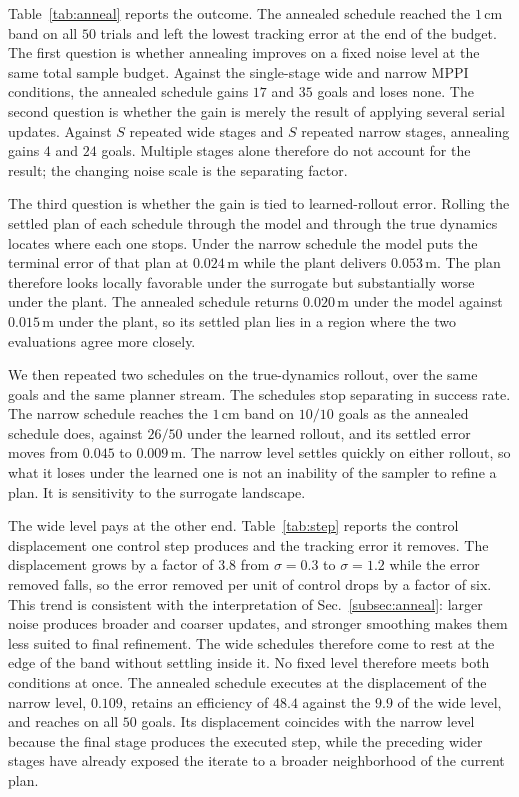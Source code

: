 \documentclass[letterpaper,10pt,conference]{ieeeconf}
\begin{document}
Table~\ref{tab:anneal} reports the outcome.
The annealed schedule reached the $1$\,cm band on all $50$ trials and left the lowest tracking error at the end of the budget.
The first question is whether annealing improves on a fixed noise level at the same total sample budget.
Against the single-stage wide and narrow MPPI conditions, the annealed schedule gains $17$ and $35$ goals and loses none.
The second question is whether the gain is merely the result of applying several serial updates.
Against $S$ repeated wide stages and $S$ repeated narrow stages, annealing gains $4$ and $24$ goals.
Multiple stages alone therefore do not account for the result; the changing noise scale is the separating factor.

The third question is whether the gain is tied to learned-rollout error.
Rolling the settled plan of each schedule through the model and through the true dynamics locates where each one stops.
Under the narrow schedule the model puts the terminal error of that plan at $0.024$\,m while the plant delivers $0.053$\,m.
The plan therefore looks locally favorable under the surrogate but substantially worse under the plant.
The annealed schedule returns $0.020$\,m under the model against $0.015$\,m under the plant, so its settled plan lies in a region where the two evaluations agree more closely.

We then repeated two schedules on the true-dynamics rollout, over the same goals and the same planner stream.
The schedules stop separating in success rate.
The narrow schedule reaches the $1$\,cm band on $10/10$ goals as the annealed schedule does, against $26/50$ under the learned rollout, and its settled error moves from $0.045$ to $0.009$\,m.
The narrow level settles quickly on either rollout, so what it loses under the learned one is not an inability of the sampler to refine a plan.
It is sensitivity to the surrogate landscape.

The wide level pays at the other end.
Table~\ref{tab:step} reports the control displacement one control step produces and the tracking error it removes.
The displacement grows by a factor of $3.8$ from $\sigma = 0.3$ to $\sigma = 1.2$ while the error removed falls, so the error removed per unit of control drops by a factor of six.
This trend is consistent with the interpretation of Sec.~\ref{subsec:anneal}: larger noise produces broader and coarser updates, and stronger smoothing makes them less suited to final refinement.
The wide schedules therefore come to rest at the edge of the band without settling inside it.
No fixed level therefore meets both conditions at once.
The annealed schedule executes at the displacement of the narrow level, $0.109$, retains an efficiency of $48.4$ against the $9.9$ of the wide level, and reaches on all $50$ goals.
Its displacement coincides with the narrow level because the final stage produces the executed step, while the preceding wider stages have already exposed the iterate to a broader neighborhood of the current plan.
\end{document}
